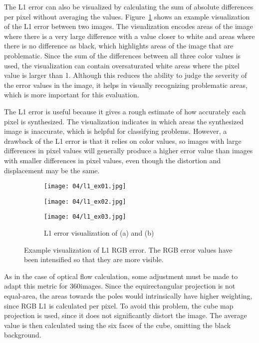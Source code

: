 The L1 error can also be visualized by calculating the sum of absolute differences per pixel without averaging the values. Figure~\ref{fig:l1_example} shows an example visualization of the L1 error between two images. The visualization encodes areas of the image where there is a very large difference with a value closer to white and areas where there is no difference as black, which highlights areas of the image that are problematic. Since the sum of the differences between all three color values is used, the visualization can contain oversaturated white areas where the pixel value is larger than 1. Although this reduces the ability to judge the severity of the error values in the image, it helps in visually recognizing problematic areas, which is more important for this evaluation.

The L1 error is useful because it gives a rough estimate of how accurately each pixel is synthesized. The visualization indicates in which areas the synthesized image is inaccurate, which is helpful for classifying problems. However, a drawback of the L1 error is that it relies on color values, so images with large differences in pixel values will generally produce a higher error value than images with smaller differences in pixel values, even though the distortion and displacement may be the same.

\begin{figure}
\centering
    \hfill
    \begin{subfigure}[t]{0.3\textwidth}
            \centering
            \texttt{[image: 04/l1\_ex01.jpg]}
            \caption{}
    \end{subfigure}%
    \hfill
    \begin{subfigure}[t]{0.3\textwidth}
            \centering
            \texttt{[image: 04/l1\_ex02.jpg]}
            \caption{}
    \end{subfigure}
    \hfill
    \begin{subfigure}[t]{0.3\textwidth}
            \centering
            \texttt{[image: 04/l1\_ex03.jpg]}
            \caption{L1 error visualization of (a) and (b)}
    \end{subfigure}%
    \hfill
    \hfill
  \caption[Example visualization of L1 RGB error]{Example visualization of L1 RGB error. The RGB error values have been intensified so that they are more visible.} \label{fig:l1_example}
\end{figure}

As in the case of optical flow calculation, some adjustment must be made to adapt this metric for 360\degree images. Since the equirectangular projection is not equal-area, the areas towards the poles would intrinsically have higher weighting, since RGB L1 is calculated per pixel. To avoid this problem, the cube map projection is used, since it does not significantly distort the image. The average value is then calculated using the six faces of the cube, omitting the black background.

